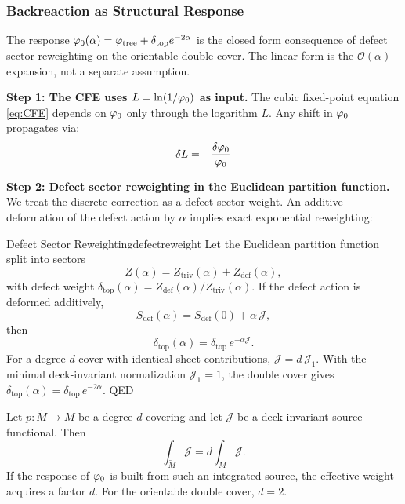 \subsubsection{Backreaction as Structural Response}

The response $\varphi_0(\alpha) = \varphi_{\mathrm{tree}} + \delta_{\mathrm{top}} e^{-2\alpha}$ is the closed form
consequence of defect sector reweighting on the orientable double cover. The linear form
is the $\mathcal{O}(\alpha)$ expansion, not a separate assumption.

\textbf{Step 1: The CFE uses $L = \ln(1/\varphi_0)$ as input.}
The cubic fixed-point equation \eqref{eq:CFE} depends on $\varphi_0$ only through 
the logarithm $L$. Any shift in $\varphi_0$ propagates via:
\begin{equation}
    \delta L = -\frac{\delta\varphi_0}{\varphi_0}
\end{equation}

\textbf{Step 2: Defect sector reweighting in the Euclidean partition function.}
We treat the discrete correction as a defect sector weight. An additive deformation of the
defect action by $\alpha$ implies exact exponential reweighting:
\begin{lemma}{Defect Sector Reweighting}{defectreweight}
Let the Euclidean partition function split into sectors
\begin{equation}
    Z(\alpha)=Z_{\mathrm{triv}}(\alpha)+Z_{\mathrm{def}}(\alpha),
\end{equation}
with defect weight $\delta_{\mathrm{top}}(\alpha)=Z_{\mathrm{def}}(\alpha)/Z_{\mathrm{triv}}(\alpha)$.
If the defect action is deformed additively,
\begin{equation}
    S_{\mathrm{def}}(\alpha)=S_{\mathrm{def}}(0)+\alpha\,\mathcal{J},
\end{equation}
then
\begin{equation}
    \delta_{\mathrm{top}}(\alpha)=\delta_{\mathrm{top}}\,e^{-\alpha\mathcal{J}}.
\end{equation}
For a degree-$d$ cover with identical sheet contributions, $\mathcal{J}=d\,\mathcal{J}_1$.
With the minimal deck-invariant normalization $\mathcal{J}_1=1$, the double cover gives
$\delta_{\mathrm{top}}(\alpha)=\delta_{\mathrm{top}}\,e^{-2\alpha}$. \hfill QED
\end{lemma}

\begin{tcolorbox}[colback=blue!3, colframe=blue!40, 
    title={\textbf{Lemma (Cover-Degree Scaling of Deck-Invariant Response)}}, fonttitle=\bfseries\small]
Let $p:\widetilde{M}\to M$ be a degree-$d$ covering and let $\mathcal{J}$ be a deck-invariant
source functional. Then
\begin{equation}
    \int_{\widetilde{M}}\mathcal{J} = d \int_{M}\mathcal{J}.
\end{equation}
If the response of $\varphi_0$ is built from such an integrated source, the effective
weight acquires a factor $d$. For the orientable double cover, $d=2$.
\end{tcolorbox}

